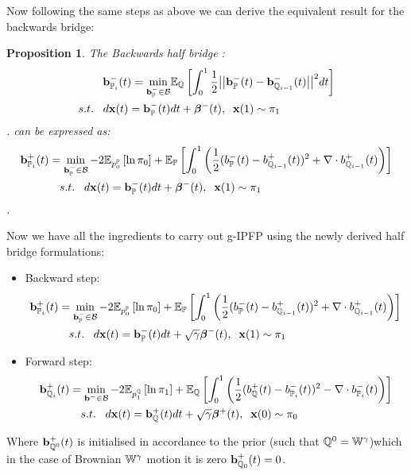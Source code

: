 \documentclass[a4paper,12pt,twoside,openright]{report}
\newtheorem{proposition}[theorem]{Proposition}
\theoremstyle{definition}
\begin{document}
Now following the same steps as above we can derive the equivalent result for the backwards bridge:
\begin{proposition}
The Backwards half bridge :
\begin{align*} 
   {\mathbf{b}}^{-}_{{\mathbb{P}}_{i}}(t) =\min_{{\mathbf{b}}_{{\mathbb{P}}}^{-} \in {\mathcal{B}} } & \mathbb{E}_{\mathbb{Q}}\left[\int_0^1 \frac{1}{2}\big|\big|{\mathbf{b}}_{\mathbb{P}}^{-}(t) -{\mathbf{b}}^{-}_{{\mathbb{Q}}_{i-1}}(t)\big|\big|^2 dt\right] \nonumber \\
    s.t.\;\;\; d{\mathbf{x}}(t) = {\mathbf{b}}_{\mathbb{P}}^{-}(t) &dt +  {\bm{\beta}}^{-}(t), \;\; {\mathbf{x}}(1) \sim \pi_1
\end{align*}.
can be expressed as:
\begin{align} \label{eq:div_control_backward}
   {\mathbf{b}}^{+}_{{\mathbb{P}}_{i}}(t) =\min_{{\mathbf{b}}_{\mathbb{P}}^{-} \in {\mathcal{B}} } -2\mathbb{E}_{p^{{\mathbb{P}}}_0}\left[\operatorname{ln} \pi_0 \right] &+ \mathbb{E}_{{\mathbb{P}}}\left[\int_0^1 \left(\frac{1}{2}(b_{\mathbb{P}}^{-}(t) - b_{{\mathbb{Q}}_{i-1}}^{+}(t))^2 + \nabla\cdot b^{+}_{{\mathbb{Q}}_{i-1}}(t) \right)\right] \nonumber \\
    s.t.\;\;\; d{\mathbf{x}}(t) = {\mathbf{b}}_{\mathbb{P}}^{-}(t) &dt +  {\bm{\beta}}^{-}(t), \;\; {\mathbf{x}}(1) \sim \pi_1
\end{align}.
\end{proposition}
Now we have all the ingredients to carry out g-IPFP using the newly derived half bridge formulations:
\begin{itemize}
    \item Backward step:
    \begin{align*}
   {\mathbf{b}}^{+}_{{\mathbb{P}}_{i}}(t) =\min_{{\mathbf{b}}_{\mathbb{P}}^{-} \in {\mathcal{B}} } -2\mathbb{E}_{p^{{\mathbb{P}}}_0}\left[\operatorname{ln} \pi_0 \right] &+ \mathbb{E}_{{\mathbb{P}}}\left[\int_0^1 \left(\frac{1}{2}(b_{\mathbb{P}}^{-}(t) - b_{{\mathbb{Q}}_{i-1}}^{+}(t))^2 + \nabla\cdot b^{+}_{{\mathbb{Q}}_{i-1}}(t) \right)\right] \nonumber \\
    s.t.\;\;\; d{\mathbf{x}}(t) = {\mathbf{b}}_{\mathbb{P}}^{-}(t) &dt + \sqrt{\gamma} {\bm{\beta}}^{-}(t), \;\; {\mathbf{x}}(1) \sim \pi_1
    \end{align*}
    \item Forward step:
    \begin{align*} 
   {\mathbf{b}}^{+}_{{\mathbb{Q}}_{i}}(t) =\min_{{\mathbf{b}}^{-} \in {\mathcal{B}} } -2\mathbb{E}_{p^{{\mathbb{Q}}}_1}\left[\operatorname{ln} \pi_1 \right] &+ \mathbb{E}_{{\mathbb{Q}}}\left[\int_0^1 \left(\frac{1}{2}(b_{\mathbb{Q}}^{+}(t) - b_{{\mathbb{P}}_{i}}^{-}(t))^2 - \nabla\cdot b^{-}_{{\mathbb{P}}_{i}}(t) \right)\right] \nonumber \\
    s.t.\;\;\; d{\mathbf{x}}(t) = {\mathbf{b}}_{\mathbb{Q}}^{+}(t) &dt + \sqrt{\gamma} {\bm{\beta}}^{+}(t), \;\; {\mathbf{x}}(0) \sim \pi_0
    \end{align*}
\end{itemize}
Where ${\mathbf{b}}^{+}_{{\mathbb{Q}}^{0}}(t)$  is initialised in accordance to the prior (such that ${\mathbb{Q}}^0=\mathbb{W}^\gamma$)which in the case of Brownian $\mathbb{W}^\gamma$ motion it is zero ${\mathbf{b}}^{+}_{{\mathbb{Q}}_{0}}(t) =0$.
\end{document}
